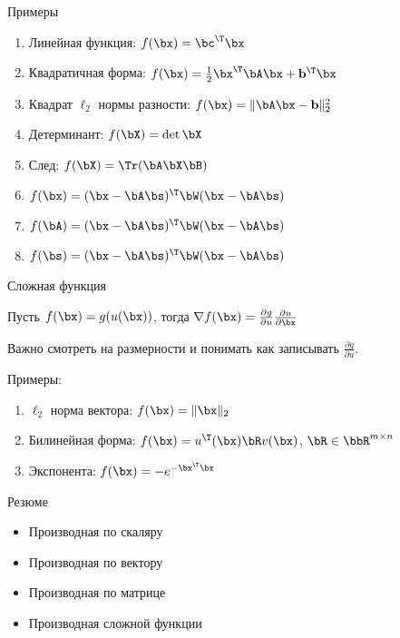 \documentclass[12pt,russian]{beamer}
\begin{document}
\begin{frame}{Примеры}
\begin{enumerate}
\item Линейная функция: $f(\bx) = \bc^{\T}\bx$
\item Квадратичная форма: $f(\bx) = \frac{1}{2}\bx^{\T}\bA\bx + \mathbf{b}^{\T}\bx$
\item Квадрат $\ell_2$ нормы разности: $f(\bx) = \|\bA\bx - \mathbf{b}\|^2_2$
\item Детерминант: $f(\bX) = \det{\bX}$
\item След: $f(\bX) = \Tr(\bA\bX\bB)$
\item $f(\bx) = (\bx - \bA\bs)^{\T}\bW(\bx - \bA\bs)$
\item $f(\bA) = (\bx - \bA\bs)^{\T}\bW(\bx - \bA\bs)$
\item $f(\bs) = (\bx - \bA\bs)^{\T}\bW(\bx - \bA\bs)$
\end{enumerate}
\end{frame}

\begin{frame}{Сложная функция}

Пусть $f(\bx) = g(u(\bx))$, тогда $\nabla f(\bx) = \frac{\partial g}{\partial u} \frac{\partial u}{\partial \bx}$

Важно смотреть на размерности и понимать как записывать $\frac{\partial g}{\partial u}$.

Примеры:
\begin{enumerate}
\item $\ell_2$ норма вектора: $f(\bx) = \|\bx\|_2$
\item Билинейная форма: $f(\bx) = u^{\T}(\bx)\bR v(\bx)$, $\bR \in \bbR^{m \times n}$
\item Экспонента: $f(\bx) = - e^{-\bx^{\T}\bx}$
\end{enumerate}
\end{frame}

\begin{frame}{Резюме}
\begin{itemize}
\item Производная по скаляру
\item Производная по вектору
\item Производная по матрице
\item Производная сложной функции
\end{itemize}
\end{frame}
\end{document}
